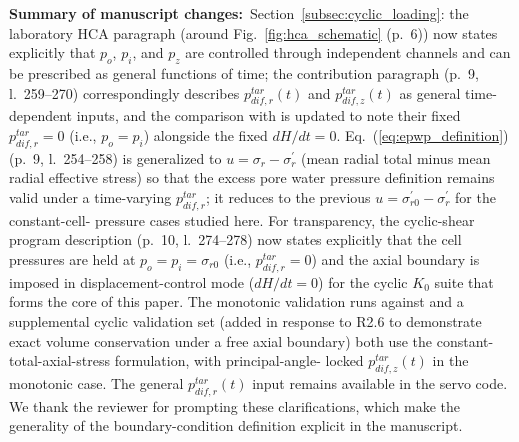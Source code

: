 \documentclass[11pt,a4paper]{article}
\newcommand{\changed}[1]{\par\noindent\textbf{Summary of manuscript changes:}\ #1\par}
\newcommand{\manref}[1]{(#1)}                  %
\begin{document}
\changed{Section~\ref{subsec:cyclic_loading}: the laboratory HCA
paragraph (around Fig.~\ref{fig:hca_schematic} \manref{p.~6}) now
states explicitly that $p_o$, $p_i$, and $p_z$ are controlled through
independent channels and can be prescribed as general functions of
time; the contribution paragraph
\manref{p.~9, l.~259--270} correspondingly describes
$p_{dif,r}^{tar}(t)$ and $p_{dif,z}^{tar}(t)$ as general
time-dependent inputs, and the comparison with \citet{Han2024jgs}
is updated to note their fixed $p_{dif,r}^{tar}=0$ (i.e.,
$p_o=p_i$) alongside the fixed $dH/dt=0$.
Eq.~(\ref{eq:epwp_definition}) \manref{p.~9, l.~254--258} is
generalized to $u = \sigma_r - \sigma_r^{\prime}$ (mean radial total
minus mean radial effective stress) so that the excess pore water
pressure definition remains valid under a time-varying
$p_{dif,r}^{tar}$; it reduces to the previous
$u=\sigma_{r0}^{\prime}-\sigma_r^{\prime}$ for the constant-cell-
pressure cases studied here. For transparency, the cyclic-shear
program description \manref{p.~10, l.~274--278} now states explicitly
that the cell pressures are held at $p_o=p_i=\sigma_{r0}$
(i.e., $p_{dif,r}^{tar}=0$) and the axial boundary is imposed in
displacement-control mode ($dH/dt=0$) for the cyclic $K_0$ suite
that forms the core of this paper. The monotonic validation
runs against \citet{Nakata1998} and a supplemental cyclic
validation set (added in response to R2.6 to demonstrate exact
volume conservation under a free axial boundary) both use the
constant-total-axial-stress formulation, with principal-angle-
locked $p_{dif,z}^{tar}(t)$ in the monotonic case. The general
$p_{dif,r}^{tar}(t)$ input remains available in the servo
code. We thank the
reviewer for prompting these clarifications, which make the
generality of the boundary-condition definition explicit in the
manuscript.}
\end{document}
